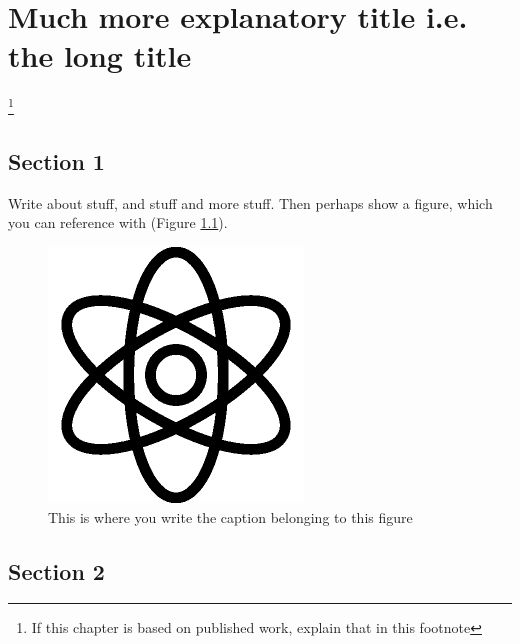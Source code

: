

\chapter[Short title]{Much more explanatory title i.e. the long title}\label{chap:LABELTITLE3}
\footnote{If this chapter is based on published work, explain that in this footnote} 

\begin{refsection}


\newpage	
\section{Section 1}

Write about stuff, and stuff and more stuff. Then perhaps show a figure, which you can reference with (Figure \ref{fig:LABELFORFIG3_1}).

\begin{figure}
\begin{center}
\includegraphics[width=0.7\columnwidth]{./C3_Topic2/figure_1/fig1.png}
\caption{\label{fig:LABELFORFIG3_1} This is where you write the caption belonging to this figure}
\end{center}
\end{figure}


\section{Section 2}


\end{refsection}
